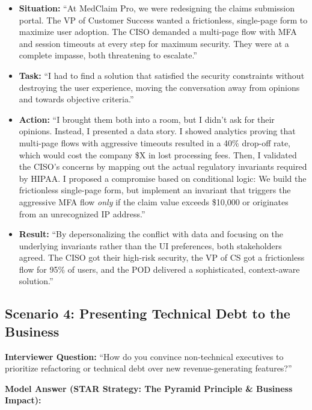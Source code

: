 \documentclass[
  11pt,
  openany,
  oneside]{book}
\providecommand{\tightlist}{%
  \setlength{\itemsep}{0pt}\setlength{\parskip}{0pt}}
\begin{document}
\begin{itemize}
\tightlist
\item
  \textbf{Situation:} ``At MedClaim Pro, we were redesigning the claims
  submission portal. The VP of Customer Success wanted a frictionless,
  single-page form to maximize user adoption. The CISO demanded a
  multi-page flow with MFA and session timeouts at every step for
  maximum security. They were at a complete impasse, both threatening to
  escalate.''
\item
  \textbf{Task:} ``I had to find a solution that satisfied the security
  constraints without destroying the user experience, moving the
  conversation away from opinions and towards objective criteria.''
\item
  \textbf{Action:} ``I brought them both into a room, but I didn't ask
  for their opinions. Instead, I presented a data story. I showed
  analytics proving that multi-page flows with aggressive timeouts
  resulted in a 40\% drop-off rate, which would cost the company \$X in
  lost processing fees. Then, I validated the CISO's concerns by mapping
  out the actual regulatory invariants required by HIPAA. I proposed a
  compromise based on conditional logic: We build the frictionless
  single-page form, but implement an invariant that triggers the
  aggressive MFA flow \emph{only} if the claim value exceeds \$10,000 or
  originates from an unrecognized IP address.''
\item
  \textbf{Result:} ``By depersonalizing the conflict with data and
  focusing on the underlying invariants rather than the UI preferences,
  both stakeholders agreed. The CISO got their high-risk security, the
  VP of CS got a frictionless flow for 95\% of users, and the POD
  delivered a sophisticated, context-aware solution.''
\end{itemize}

\subsection{Scenario 4: Presenting Technical Debt to the
Business}\label{scenario-4-presenting-technical-debt-to-the-business}

\textbf{Interviewer Question:} ``How do you convince non-technical
executives to prioritize refactoring or technical debt over new
revenue-generating features?''

\textbf{Model Answer (STAR Strategy: The Pyramid Principle \& Business
Impact):}
\end{document}
